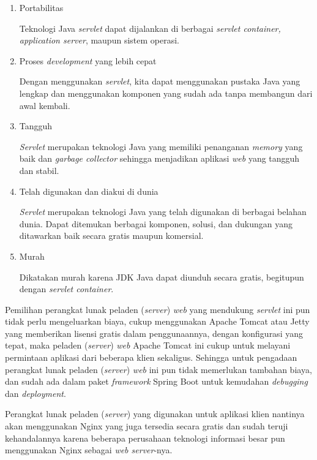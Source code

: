 \documentclass[pdftex,12pt, oneside]{article}
\begin{document}
\begin{enumerate}
\begin{enumerate}
		\item Portabilitas
		
Teknologi Java \textit{servlet} dapat dijalankan di berbagai \textit{servlet container, application server}, maupun sistem operasi.		
		
		\item Proses \textit{development} yang lebih cepat
		
Dengan menggunakan \textit{servlet}, kita dapat menggunakan pustaka Java yang lengkap dan menggunakan komponen yang sudah ada tanpa membangun dari awal kembali.		
		
		\item Tangguh
		
\textit{Servlet} merupakan teknologi Java yang memiliki penanganan \textit{memory} yang baik dan \textit{garbage collector} sehingga menjadikan aplikasi \textit{web} yang tangguh dan stabil.		
		
		\item Telah digunakan dan diakui di dunia
		
\textit{Servlet} merupakan teknologi Java yang telah digunakan di berbagai belahan dunia. Dapat ditemukan berbagai komponen, solusi, dan dukungan yang ditawarkan baik secara gratis maupun komersial.		
		
		\item Murah
		
Dikatakan murah karena JDK Java dapat diunduh secara gratis, begitupun dengan \textit{servlet container}.		
		
	\end{enumerate}
	
Pemilihan perangkat lunak peladen (\textit{server}) \textit{web} yang mendukung \textit{servlet} ini pun tidak perlu mengeluarkan biaya, cukup menggunakan Apache Tomcat atau Jetty yang memberikan lisensi gratis dalam penggunaannya, dengan konfigurasi yang tepat, maka peladen (\textit{server}) \textit{web} Apache Tomcat ini cukup untuk melayani permintaan aplikasi dari beberapa klien sekaligus. Sehingga untuk pengadaan perangkat lunak peladen (\textit{server}) \textit{web} ini pun tidak memerlukan tambahan biaya, dan sudah ada dalam paket \textit{framework} Spring Boot untuk kemudahan \textit{debugging} dan \textit{deployment}.

Perangkat lunak peladen (\textit{server}) yang digunakan untuk aplikasi klien nantinya akan menggunakan Nginx yang juga tersedia secara gratis dan sudah teruji kehandalannya karena beberapa perusahaan teknologi informasi besar pun menggunakan Nginx sebagai \textit{web server}-nya.


\end{enumerate}
\end{document}
